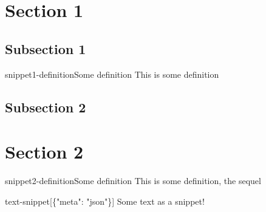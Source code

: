 \documentclass[preview]{standalone}
\begin{document}
\genpage

\section{Section 1}

\subsection{Subsection 1}

\begin{snippetdefinition}{snippet1-definition}{Some definition}
    This is some definition
\end{snippetdefinition}

\subsection{Subsection 2}

\section{Section 2}

\begin{snippetdefinition}{snippet2-definition}{Some definition}
    This is some definition, the sequel
\end{snippetdefinition}


\begin{snippet}{text-snippet}[\{"meta": "json"\}]
    Some text as a snippet!
\end{snippet}
\end{document}
